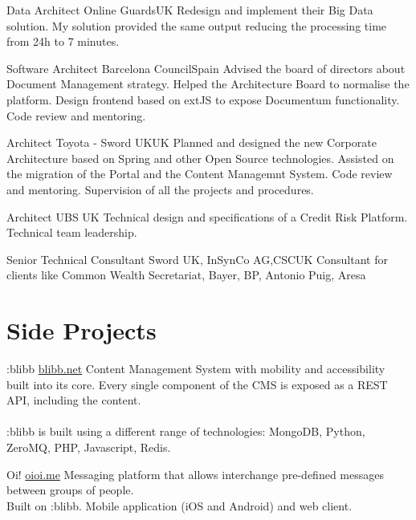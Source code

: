 \documentclass[10pt, a4paper]{moderncv}
\begin{document}
{Data Architect}
{Online Guards}{UK}{}
{Redesign and implement their Big Data solution. My solution provided the same output reducing the processing time from 24h to 7 minutes.\\}

{Software Architect}
{Barcelona Council}{Spain}{}
{Advised the board of directors about Document Management strategy. Helped the Architecture Board to normalise the platform. Design frontend based on extJS to expose Documentum functionality. Code review and mentoring.\\}

{Architect}
{Toyota - Sword UK}{UK}{}
{Planned and designed the new Corporate Architecture based on Spring and other Open Source technologies. Assisted on the migration of the Portal and the Content Managemnt System. Code review and mentoring. Supervision of all the projects and procedures.\\}

{Architect}
{UBS }{UK}{}
{Technical design and specifications of a Credit Risk Platform. Technical team leadership.\\}

{Senior Technical Consultant}
{Sword UK, InSynCo AG,CSC}{UK}{}
{Consultant for clients like Common Wealth Secretariat, Bayer, BP, Antonio Puig, Aresa\\}


\cvline{}{}

\section{Side Projects}


\cvline{}{}

{:blibb}
{}{}{\url{blibb.net}}
{Content Management System with mobility and accessibility built into its core. Every single component of the CMS is exposed as a REST API, including the content.\\\\ :blibb is built using a different range of technologies: MongoDB, Python, ZeroMQ, PHP, Javascript, Redis.}

\cvline{}{}

{Oi!}
{}{}{\url{oioi.me}}
{Messaging platform that allows interchange pre-defined messages between groups of people.\\Built on :blibb. Mobile application (iOS and Android) and web client.}
\end{document}
